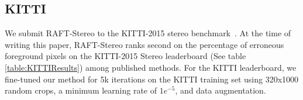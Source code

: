 \documentclass[10pt,twocolumn,letterpaper]{article}
\begin{document}
\subsection{KITTI}
\setlength\tabcolsep{.4em}
\begin{table}[t]
\centering
{}
\caption{Results on the KITTI-2015 \cite{kitti} leaderboard. Only published results are included. Best results for each evaluation metric are bolded, second best are underlined. At the time of submission, RAFT-Stereo ranks second on the percentage of erroneous (EPE $> 3.0$ px) foreground pixels among published methods. }
\label{table:KITTIResults}
\end{table}

We submit RAFT-Stereo to the KITTI-2015 stereo benchmark~\cite{kitti}.
At the time of writing this paper, RAFT-Stereo ranks second on the percentage of erroneous foreground pixels on the KITTI-2015 Stereo leaderboard (See table \ref{table:KITTIResults}) among published methods. For the KITTI leaderboard, we fine-tuned our method for 5k iterations on the KITTI training set using 320x1000 random crops, a minimum learning rate of $1e^{-5}$, and data augmentation. 
\end{document}
